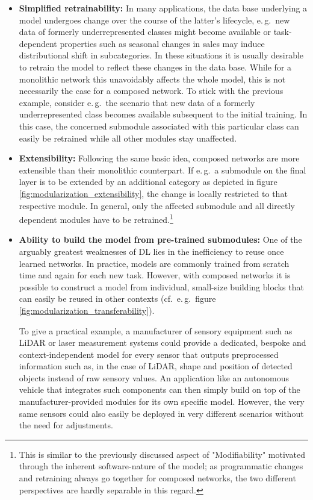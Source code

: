 \begin{itemize}
    \item \textbf{Simplified retrainability:} In many applications, the data base underlying a model undergoes change over the course of the latter's lifecycle, e.\,g.\ new data of formerly underrepresented classes might become available or task-dependent properties such as seasonal changes in sales may induce distributional shift in subcategories. In these situations it is usually desirable to retrain the model to reflect these changes in the data base. While for a monolithic network this unavoidably affects the whole model, this is not necessarily the case for a composed network. To stick with the previous example, consider e.\,g.\ the scenario that new data of a formerly underrepresented class becomes available subsequent to the initial training. In this case, the concerned submodule associated with this particular class can easily be retrained while all other modules stay unaffected.
    \item \textbf{Extensibility:} Following the same basic idea, composed networks are more extensible than their monolithic counterpart. If e.\,g.\ a submodule on the final layer is to be extended by an additional category as depicted in figure \ref{fig:modularization_extensibility}, the change is locally restricted to that respective module. In general, only the affected submodule and all directly dependent modules have to be retrained.\footnote{This is similar to the previously discussed aspect of "Modifiability" motivated through the inherent software-nature of the model; as programmatic changes and retraining always go together for composed networks, the two different perspectives are hardly separable in this regard.}
    \item \textbf{Ability to build the model from pre-trained submodules:} One of the arguably greatest weaknesses of DL lies in the inefficiency to reuse once learned networks. In practice, models are commonly trained from scratch time and again for each new task. However, with composed networks it is possible to construct a model from individual, small-size building blocks that can easily be reused in other contexts (cf.\ e.\,g.\ figure \ref{fig:modularization_transferability}).
    
    To give a practical example, a manufacturer of sensory equipment such as LiDAR or laser measurement systems could provide a dedicated, bespoke and context-independent model for every sensor that outputs preprocessed information such as, in the case of LiDAR, shape and position of detected objects instead of raw sensory values. An application like an autonomous vehicle that integrates such components can then simply build on top of the manufacturer-provided modules for its own specific model. However, the very same sensors could also easily be deployed in very different scenarios without the need for adjustments.
    

\end{itemize}
